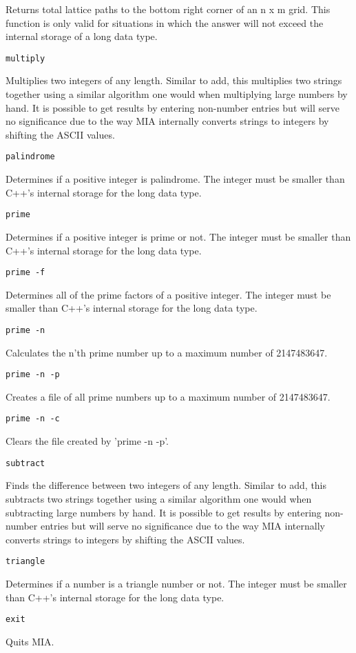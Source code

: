 Returns total lattice paths to the bottom right corner of an n x m grid. This function is only valid for situations in which the answer will not exceed the internal storage of a long data type.
\begin{lstlisting} 
multiply  
\end{lstlisting}
Multiplies two integers of any length. Similar to add, this multiplies two strings together using a similar algorithm one would when multiplying large numbers by hand. It is possible to get results by entering non-number entries but will serve no significance due to the way MIA internally converts strings to integers by shifting the ASCII values.
\begin{lstlisting} 
palindrome   
\end{lstlisting}
Determines if a positive integer is palindrome. The integer must be smaller than C++'s internal storage for the long data type.
\begin{lstlisting} 
prime   
\end{lstlisting}
Determines if a positive integer is prime or not. The integer must be smaller than C++'s internal storage for the long data type.
\begin{lstlisting} 
prime -f   
\end{lstlisting}
Determines all of the prime factors of a positive integer. The integer must be smaller than C++'s internal storage for the long data type.
\begin{lstlisting} 
prime -n  
\end{lstlisting}
Calculates the n'th prime number up to a maximum number of 2147483647.
\begin{lstlisting} 
prime -n -p   
\end{lstlisting}
Creates a file of all prime numbers up to a maximum number of 2147483647.
\begin{lstlisting} 
prime -n -c   
\end{lstlisting}
Clears the file created by 'prime -n -p'.
\begin{lstlisting} 
subtract   
\end{lstlisting}
Finds the difference between two integers of any length. Similar to add, this subtracts two strings together using a similar algorithm one would when subtracting large numbers by hand. It is possible to get results by entering non-number entries but will serve no significance due to the way MIA internally converts strings to integers by shifting the ASCII values.
\begin{lstlisting} 
triangle   
\end{lstlisting}
Determines if a number is a triangle number or not. The integer must be smaller than C++'s internal storage for the long data type.
\begin{lstlisting} 
exit  
\end{lstlisting}
Quits MIA. 